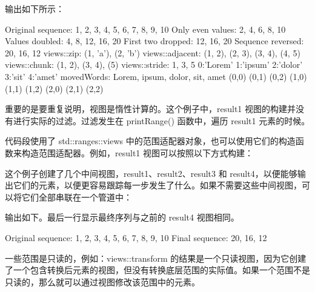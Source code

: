 输出如下所示：

\begin{shell}
Original sequence: 1, 2, 3, 4, 5, 6, 7, 8, 9, 10
Only even values: 2, 4, 6, 8, 10
Values doubled: 4, 8, 12, 16, 20
First two dropped: 12, 16, 20
Sequence reversed: 20, 16, 12
views::zip: (1, 'a'), (2, 'b')
views::adjacent: (1, 2), (2, 3), (3, 4), (4, 5)
views::chunk: (1, 2), (3, 4), (5)
views::stride: 1, 3, 5
0:'Lorem' 1:'ipsum' 2:'dolor' 3:'sit' 4:'amet'
movedWords: Lorem, ipsum, dolor, sit, amet
(0,0) (0,1) (0,2) (1,0) (1,1) (1,2) (2,0) (2,1) (2,2)
\end{shell}

重要的是要重复说明，视图是惰性计算的。这个例子中，result1 视图的构建并没有进行实际的过滤。过滤发生在 printRange() 函数中，遍历 result1 元素的时候。

代码段使用了 std::ranges::views 中的范围适配器对象，也可以使用它们的构造函数来构造范围适配器。例如，result1 视图可以按照以下方式构建：


这个例子创建了几个中间视图，result1、result2、result3 和 result4，以便能够输出它们的元素，以便更容易跟踪每一步发生了什么。如果不需要这些中间视图，可以将它们全部串联在一个管道中：


输出如下。最后一行显示最终序列与之前的 result4 视图相同。

\begin{shell}
Original sequence: 1, 2, 3, 4, 5, 6, 7, 8, 9, 10
Final sequence: 20, 16, 12
\end{shell}


一些范围是只读的，例如：views::transform 的结果是一个只读视图，因为它创建了一个包含转换后元素的视图，但没有转换底层范围的实际值。如果一个范围不是只读的，那么就可以通过视图修改该范围中的元素。

